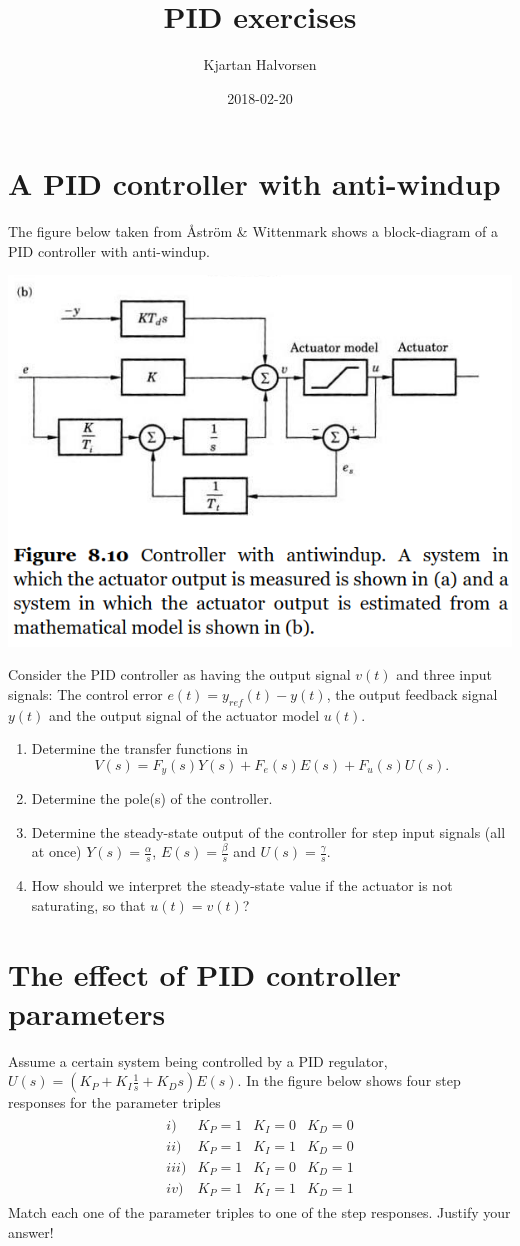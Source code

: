 \documentclass[letterpaper]{scrartcl}
\author{Kjartan Halvorsen}
\date{2018-02-20}
\title{PID exercises}
\begin{document}
\maketitle

\section{A PID controller with anti-windup}
\label{sec-1}
The figure below taken from Åström \& Wittenmark shows a block-diagram of a PID controller with anti-windup.
\begin{center}
\includegraphics[width=0.51\linewidth]{../figures/fig8-10.png}
\end{center}
Consider the PID controller as having the output signal \(v(t)\) and three input signals: The control error \(e(t) = y_{ref}(t) - y(t)\), the output feedback signal \(y(t)\) and the output signal of the actuator model \(u(t)\). 
\begin{enumerate}
\item Determine the transfer functions in 
\[V(s) = F_y(s) Y(s) + F_e(s)E(s) + F_u(s) U(s). \]
\item Determine the pole(s) of the controller.
\item Determine the steady-state output of the controller for step input signals (all at once) \(Y(s) = \frac{\alpha}{s}\), \(E(s) = \frac{\beta}{s}\) and \(U(s) = \frac{\gamma}{s}\).
\item How should we interpret the steady-state value if the actuator is not saturating, so that \(u(t) = v(t)\)?
\end{enumerate}

\section{The effect of PID controller parameters}
\label{sec-2}
Assume a certain system being controlled by a PID regulator, \( U(s)=(K_P+K_I \frac{1}{s}+K_D s) E(s)\). In the figure below shows four step responses for the parameter
triples 
\begin{eqnarray*}
\begin{array}{cccc}
i) & K_P=1 & K_I=0 & K_D=0 \\
ii) & K_P=1 & K_I=1 & K_D=0 \\
iii) & K_P=1 & K_I=0 & K_D=1 \\
iv) & K_P=1 & K_I=1 & K_D=1 
\end{array}
\end{eqnarray*}
Match each one of the parameter triples to one of the step 
responses. Justify your answer!
\end{document}
